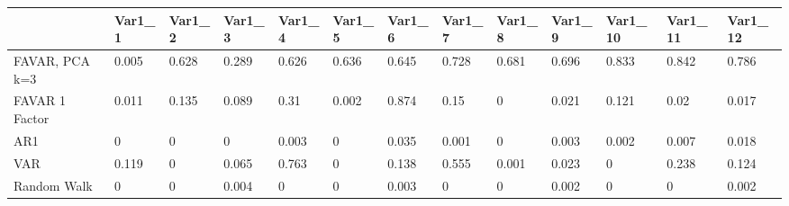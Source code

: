 \begin{tabular}{lllllllllllll}
\toprule 
& Var1_1 & Var1_2 & Var1_3 & Var1_4 & Var1_5 & Var1_6 & Var1_7 & Var1_8 & Var1_9 & Var1_10 & Var1_11 & Var1_12 \\ 
\midrule 
FAVAR, PCA k=3 & 0.005 & 0.628 & 0.289 & 0.626 & 0.636 & 0.645 & 0.728 & 0.681 & 0.696 & 0.833 & 0.842 & 0.786 \\ 
FAVAR 1 Factor & 0.011 & 0.135 & 0.089 & 0.31 & 0.002 & 0.874 & 0.15 & 0 & 0.021 & 0.121 & 0.02 & 0.017 \\ 
AR1 & 0 & 0 & 0 & 0.003 & 0 & 0.035 & 0.001 & 0 & 0.003 & 0.002 & 0.007 & 0.018 \\ 
VAR & 0.119 & 0 & 0.065 & 0.763 & 0 & 0.138 & 0.555 & 0.001 & 0.023 & 0 & 0.238 & 0.124 \\ 
Random Walk & 0 & 0 & 0.004 & 0 & 0 & 0.003 & 0 & 0 & 0.002 & 0 & 0 & 0.002 \\ 
\bottomrule 
\end{tabular}